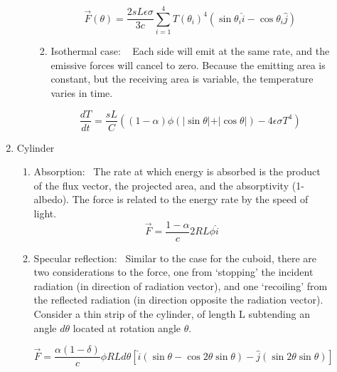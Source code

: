 \begin{description}
\begin{enumerate}
\begin{enumerate}
\begin{enumerate}
            \begin{equation}
              \vec F(\theta) = \frac {2sL \epsilon \sigma}{3c} \sum_{i=1}^4
                T(\theta_i)^4 \left(\sin \theta_i \hat {i} - \cos \theta_i \hat
                 {j} \right)
            \end{equation}
            \item{Isothermal case:} \ \newline
            Each side will emit at the same rate, and the emissive forces will
            cancel to zero.
            Because the emitting area is constant, but the receiving area is
            variable, the temperature varies in time.

            \begin{equation}
            \frac{dT}{dt} = \frac{sL}{C} \left(
              (1-\alpha) \phi \left(
                \vert \sin \theta \vert + \vert \cos \theta \vert \right)
              - 4 \epsilon \sigma T^{4} \right)
            \end{equation}
            \end{enumerate}
        \end{enumerate}

      \item {Cylinder}
        \begin{enumerate}
           \item{Absorption:}\ \newline
            The rate at which energy is absorbed is the product of the flux
            vector, the projected area, and the absorptivity (1-albedo).  The
            force is related to the energy rate by the speed of light.
            \begin{equation}
              \vec {F} = \frac {1-\alpha}{c} 2 R L \phi \hat {i}
            \end{equation}
          \item{Specular reflection:}\ \newline
            Similar to the case for the cuboid, there are two considerations
            to the force, one from `stopping' the incident radiation (in
            direction of radiation vector), and one `recoiling' from the
            reflected radiation (in direction opposite the radiation vector).
            Consider a thin strip of the cylinder, of length L subtending an
            angle $d \theta$ located at rotation angle $\theta$.

            \begin{equation*}
            \vec {F}=\frac{\alpha (1-\delta)}{c}\phi RL d \theta
            \left[\hat{i}\left(\sin \theta - \cos 2\theta \sin \theta \right)
            - \hat{j} \left(\sin 2\theta \sin \theta \right) \right]
            \end{equation*}


\end{enumerate}
\end{enumerate}
\end{description}

